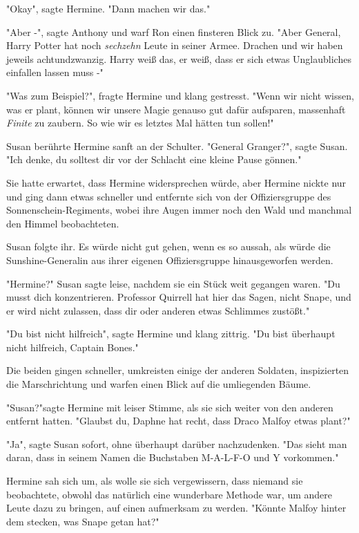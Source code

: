 {"Okay", sagte Hermine. "Dann machen wir das."

"Aber -", sagte Anthony und warf Ron einen finsteren Blick zu. "Aber General, Harry Potter hat noch \emph{sechzehn} Leute in seiner Armee. Drachen und wir haben jeweils achtundzwanzig. Harry weiß das, er weiß, dass er sich etwas Unglaubliches einfallen lassen muss -"

"Was zum Beispiel?", fragte Hermine und klang gestresst. "Wenn wir nicht wissen, was er plant, können wir unsere Magie genauso gut dafür aufsparen, massenhaft \emph{Finite} zu zaubern. So wie wir es letztes Mal hätten tun sollen!"

Susan berührte Hermine sanft an der Schulter. "General Granger?", sagte Susan. "Ich denke, du solltest dir vor der Schlacht eine kleine Pause gönnen."

Sie hatte erwartet, dass Hermine widersprechen würde, aber Hermine nickte nur und ging dann etwas schneller und entfernte sich von der Offiziersgruppe des Sonnenschein-Regiments, wobei ihre Augen immer noch den Wald und manchmal den Himmel beobachteten.

Susan folgte ihr. Es würde nicht gut gehen, wenn es so aussah, als würde die Sunshine-Generalin aus ihrer eigenen Offiziersgruppe hinausgeworfen werden.

"Hermine?" Susan sagte leise, nachdem sie ein Stück weit gegangen waren. "Du musst dich konzentrieren. Professor Quirrell hat hier das Sagen, nicht Snape, und er wird nicht zulassen, dass dir oder anderen etwas Schlimmes zustößt."

"Du bist nicht hilfreich", sagte Hermine und klang zittrig. "Du bist überhaupt nicht hilfreich, Captain Bones."

Die beiden gingen schneller, umkreisten einige der anderen Soldaten, inspizierten die Marschrichtung und warfen einen Blick auf die umliegenden Bäume.

"Susan?"sagte Hermine mit leiser Stimme, als sie sich weiter von den anderen entfernt hatten. "Glaubst du, Daphne hat recht, dass Draco Malfoy etwas plant?"

"Ja", sagte Susan sofort, ohne überhaupt darüber nachzudenken. "Das sieht man daran, dass in seinem Namen die Buchstaben M-A-L-F-O und Y vorkommen."

Hermine sah sich um, als wolle sie sich vergewissern, dass niemand sie beobachtete, obwohl das natürlich eine wunderbare Methode war, um andere Leute dazu zu bringen, auf einen aufmerksam zu werden. "Könnte Malfoy hinter dem stecken, was Snape getan hat?"

}
